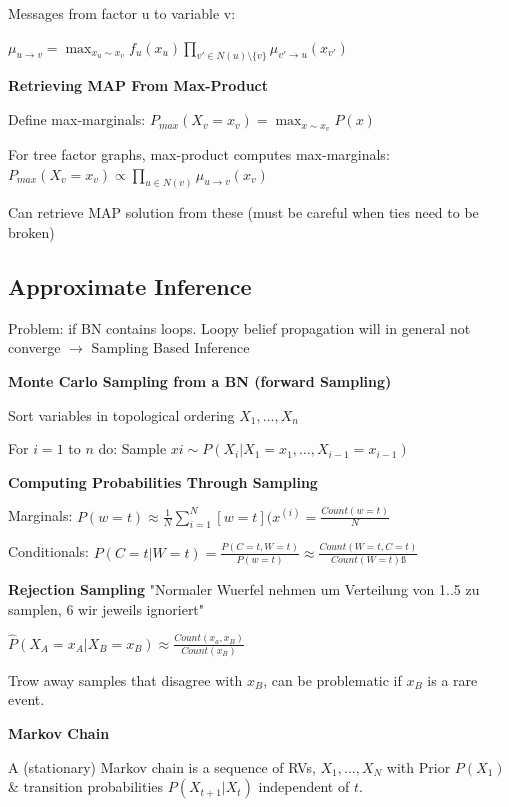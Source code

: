 \documentclass[a4paper, 11pt, landscape]{article}
\begin{document}
\begin{multicols*}{3}
Messages from factor u to variable v:

$\mu_{u \rightarrow v} = \max_{x_u \sim x_v} f_u(x_u) \prod_{v' \in N(u) \setminus \{v\}} \mu_{v' \rightarrow u}(x_{v'})$ 
 
 \textbf{Retrieving MAP From Max-Product}
 \begin{compactitem}
 \item Define max-marginals: $P_{max}(X_v =x_v) = \max_{x \sim x_v} P(x)$
 \item For tree factor graphs, max-product computes max-marginals: 
 $P_{max}(X_v = x_v) \propto \prod_{u \in N(v)} \mu_{u \rightarrow v} (x_v)$ 
\item Can retrieve MAP solution from these (must be careful when ties need to be broken)
\end{compactitem}
\subsection{Approximate Inference}
Problem: if BN contains loops.
Loopy belief propagation will in general not converge	$\rightarrow$ Sampling Based Inference

\textbf{Monte Carlo Sampling from a BN (forward Sampling)}
\begin{compactitem}
	\item Sort variables in topological ordering $X_1,...,X_n$
	\item For $i=1$ to 	$n$ do: Sample $xi \sim P(X_i | X_1=x_1, ..., X_{i-1}=x_{i-1})$
\end{compactitem}

\textbf{Computing Probabilities Through Sampling}

Marginals: $P(w=t) \approx \frac{1}{N} \sum_{i=1}^{N}[w=t](x^{(i)} =\frac{ Count(w=t)}{N}$

Conditionals: $P(C=t | W=t) = \frac{P(C=t, W=t)}{P(w=t)} \approx \frac{Count(W=t, C=t)}{Count(W=t)ß}$

\textbf{Rejection Sampling}
"Normaler Wuerfel nehmen um Verteilung von 1..5 zu samplen, 6 wir jeweils ignoriert"

$\hat{P}(X_A = x_A | X_B = x_B) \approx \frac{Count(x_a, x_B)}{Count(x_B)}$

Trow away samples that disagree with $x_B$, can be problematic if $x_B$ is a rare event. 

\textbf{Markov Chain}

A (stationary) Markov chain is a sequence of RVs, $X_1,...,X_N$ with Prior $P(X_1)$ \& transition probabilities $P(X_{t+1} | X_t)$ independent of $t$.



\end{multicols*}
\end{document}
